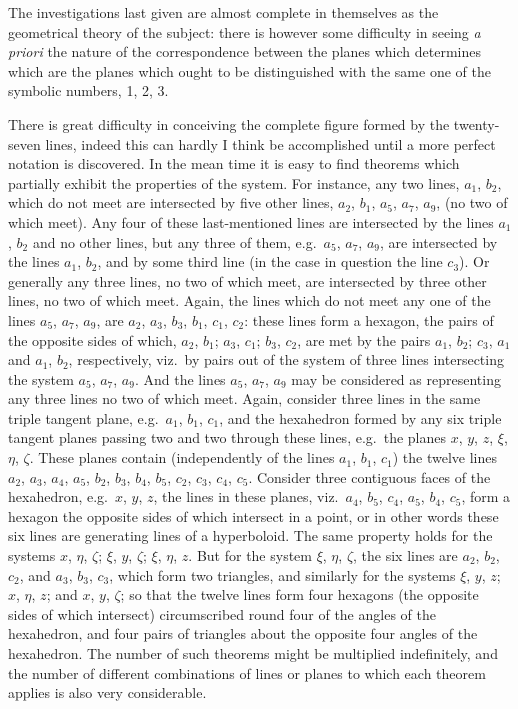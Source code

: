 \documentclass[12pt,a4paper]{article}
\begin{document}
The investigations last given are almost complete in themselves as the geometrical theory of the subject: there is however some difficulty in seeing \textit{a priori} the nature of the correspondence between the planes which determines which are the planes which ought to be distinguished with the same one of the symbolic numbers, 1, 2, 3.

There is great difficulty in conceiving the complete figure formed by the twenty-seven lines, indeed this can hardly I think be accomplished until a more perfect notation is discovered. In the mean time it is easy to find theorems which partially exhibit the properties of the system. For instance, any two lines, $a_1$, $b_2$, which do not meet are intersected by five other lines, $a_2$, $b_1$, $a_5$, $a_7$, $a_9$, (no two of which meet). Any four of these last-mentioned lines are intersected by the lines $a_1$, $b_2$ and no other lines, but any three of them, e.g.\ $a_5$, $a_7$, $a_9$, are intersected by the lines $a_1$, $b_2$, and by some third line (in the case in question the line $c_3$). Or generally any three lines, no two of which meet, are intersected by three other lines, no two of which meet. Again, the lines which do not meet any one of the lines $a_5$, $a_7$, $a_9$, are $a_2$, $a_3$, $b_3$, $b_1$, $c_1$, $c_2$: these lines form a hexagon, the pairs of the opposite sides of which, $a_2$, $b_1$; $a_3$, $c_1$; $b_3$, $c_2$, are met by the pairs $a_1$, $b_2$; $c_3$, $a_1$ and $a_1$, $b_2$, respectively, viz.\ by pairs out of the system of three lines intersecting the system $a_5$, $a_7$, $a_9$. And the lines $a_5$, $a_7$, $a_9$ may be considered as representing any three lines no two of which meet. Again, consider three lines in the same triple tangent plane, e.g.\ $a_1$, $b_1$, $c_1$, and the hexahedron formed by any six triple tangent planes passing two and two through these lines, e.g.\ the planes $x$, $y$, $z$, $\xi$, $\eta$, $\zeta$. These planes contain (independently of the lines $a_1$, $b_1$, $c_1$) the twelve lines $a_2$, $a_3$, $a_4$, $a_5$, $b_2$, $b_3$, $b_4$, $b_5$, $c_2$, $c_3$, $c_4$, $c_5$. Consider three contiguous faces of the hexahedron, e.g.\ $x$, $y$, $z$, the lines in these planes, viz.\ $a_4$, $b_5$, $c_4$, $a_5$, $b_4$, $c_5$, form a hexagon the opposite sides of which intersect in a point, or in other words these six lines are generating lines of a hyperboloid. The same property holds for the systems $x$, $\eta$, $\zeta$; $\xi$, $y$, $\zeta$; $\xi$, $\eta$, $z$. But for the system $\xi$, $\eta$, $\zeta$, the six lines are $a_2$, $b_2$, $c_2$, and $a_3$, $b_3$, $c_3$, which form two triangles, and similarly for the systems $\xi$, $y$, $z$; $x$, $\eta$, $z$; and $x$, $y$, $\zeta$; so that the twelve lines form four hexagons (the opposite sides of which intersect) circumscribed round four of the angles of the hexahedron, and four pairs of triangles about the opposite four angles of the hexahedron. The number of such theorems might be multiplied indefinitely, and the number of different combinations of lines or planes to which each theorem applies is also very considerable.
\end{document}

